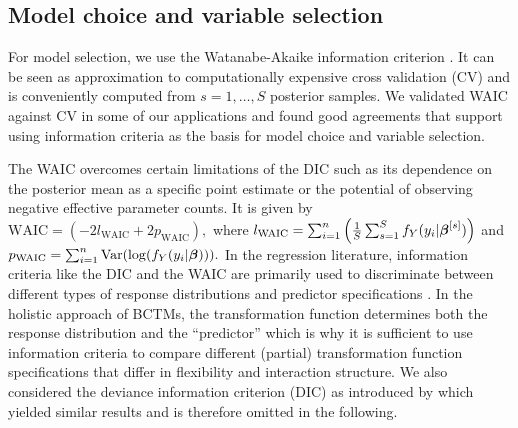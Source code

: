 \documentclass[12pt]{article}
\theoremstyle{plain}
\begin{document}




\subsection{Model choice and variable selection }\label{sec:model_sel}
For model selection, we use the  Watanabe-Akaike information criterion \citep[WAIC][]{watanabe2010}. It can be seen as approximation to computationally expensive cross validation (CV) and is conveniently computed from $s=1, \ldots, S$ posterior samples. We validated WAIC against CV in some of our applications and found good agreements that support using information criteria as the basis for model choice and variable selection.

The WAIC overcomes certain limitations of the DIC \citep[DIC;][]{spiegelhalter2002} such as its dependence on the posterior mean as a specific point estimate or the potential of observing negative effective parameter counts. It is given by
$
\text{WAIC} = (-2l_{\text{WAIC}} + 2p_{\text{WAIC}}),
$
where $l_{\text{WAIC}} = \sum_{i=1}^n \left( \frac{1}{S} \sum_{s=1}^S f_Y(y_i| \text{\boldmath$\beta$}^{[s]})\right)
$ and
$ p_{\text{WAIC}} = \sum_{i=1}^n \text{Var}(\log(f_Y(y_i|\text{\boldmath$\beta$}))).
$ In the regression literature, information criteria like the DIC and the WAIC are primarily used to discriminate between different types of response distributions and predictor specifications \citep[e.g.][]{klein2015bayesian}. In the holistic approach of BCTMs, the transformation function determines both the response distribution and  the ``predictor'' which is why it is sufficient to use information criteria to compare different (partial) transformation function specifications that differ in flexibility and interaction structure. We also considered the deviance information criterion (DIC) as introduced by \cite{spiegelhalter2002} which yielded similar results and is therefore omitted in the following.
\end{document}
